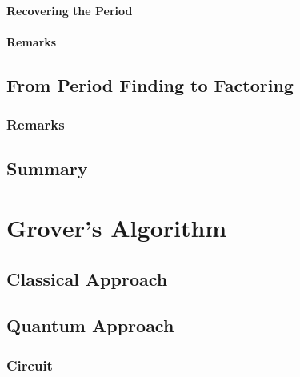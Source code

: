                 \paragraph{Recovering the Period} %

                \paragraph{Remarks} %

        \subsection{From Period Finding to Factoring} %

            \subsubsection{Remarks} %

        \subsection{Summary} %

    \section{Grover's Algorithm} %

        \subsection{Classical Approach} %

        \subsection{Quantum Approach} %

            \subsubsection{Circuit} %

